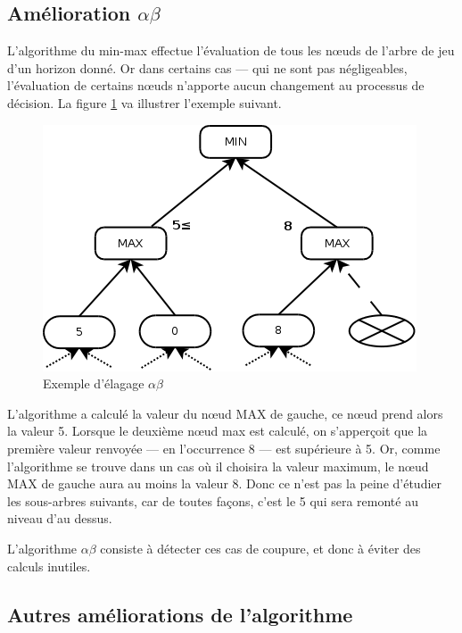 \documentclass[11pt,a4paper,titlepage,french]{article}
\begin{document}
		\subsection[Amélioration]{Amélioration $\alpha\beta$}

				L'algorithme du min-max effectue l'évaluation de tous les nœuds de l'arbre de jeu d'un horizon donné. Or dans certains cas --- qui ne sont pas négligeables, l'évaluation de certains nœuds n'apporte aucun changement au processus de décision. La figure \ref{abex} va illustrer l'exemple suivant.

				\begin{figure}[hbt]
					\label{abex}
					\begin{center}
						\includegraphics[width=\textwidth]{./alphabeta.png}
					\end{center}
					\caption{Exemple d'élagage $\alpha\beta$}
				\end{figure}

				L'algorithme a calculé la valeur du nœud MAX de gauche, ce nœud prend alors la valeur 5. Lorsque le deuxième nœud max est calculé, on s'apperçoit que la première valeur renvoyée --- en l'occurrence 8 --- est supérieure à 5. Or, comme l'algorithme se trouve dans un cas où il choisira la valeur maximum, le nœud MAX de gauche aura au moins la valeur 8. Donc ce n'est pas la peine d'étudier les sous-arbres suivants, car de toutes façons, c'est le 5 qui sera remonté au niveau d'au dessus.

				L'algorithme $\alpha\beta$ consiste à détecter ces cas de coupure, et donc à éviter des calculs inutiles.


		\subsection{Autres améliorations de l'algorithme}
\end{document}
